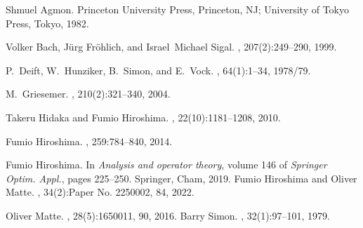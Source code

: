 \documentclass[11pt,aspectratio=1610]{beamer}
\begin{document}
\begin{frame}


%
%
\vspace{0mm}

{\scriptsize
\begin{thebibliography}{10}

Shmuel Agmon. 
\newblock {\em }Princeton University Press, Princeton, NJ; University of Tokyo Press, Tokyo, 1982.

Volker Bach, J\"{u}rg Fr\"{o}hlich, and Israel~Michael Sigal.
, 207(2):249--290, 1999.

P.~Deift, W.~Hunziker, B.~Simon, and E.~Vock.
, 64(1):1--34, 1978/79.

M.~Griesemer.
, 210(2):321--340, 2004.

Takeru Hidaka and Fumio Hiroshima.
, 22(10):1181--1208, 2010.

Fumio Hiroshima.
, 259:784--840, 2014.

Fumio Hiroshima.
\newblock In {\em Analysis and operator theory}, volume 146 of {\em Springer
  Optim. Appl.}, pages 225--250. Springer, Cham, 2019.
\vspace{-1mm}
Fumio Hiroshima and Oliver Matte.
, 34(2):Paper No. 2250002, 84, 2022.

Oliver Matte.
, 28(5):1650011, 90, 2016.
\vspace{-1mm}
Barry Simon.
, 32(1):97--101, 1979.

\end{thebibliography}
}

\end{frame}





%
%
\end{document}

